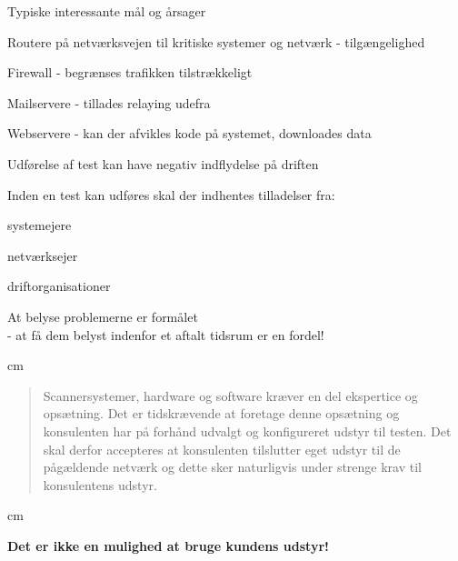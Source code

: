 \documentclass[20pt,landscape,a4paper,footrule]{foils}
\begin{document}


\begin{list1}
\item Typiske interessante mål og årsager
\begin{list2}
\item Routere på netværksvejen til kritiske systemer og netværk -
  tilgængelighed 
\item Firewall - begrænses trafikken tilstrækkeligt
\item Mailservere - tillades relaying udefra
\item Webservere - kan der afvikles kode på systemet, downloades data     
\end{list2}
\end{list1}


\begin{list1}
\item Udførelse af test kan have negativ indflydelse på driften
\item Inden en test kan udføres skal der indhentes tilladelser fra:
\begin{list2}
\item systemejere
\item netværksejer
\item driftorganisationer
\end{list2}
\item At belyse problemerne er formålet\\
- at få dem belyst indenfor et aftalt tidsrum er en fordel!
\end{list1}


 cm
\begin{quote}
Scannersystemer, hardware og software kræver en del ekspertice og
opsætning. Det er tidskrævende at foretage denne opsætning og
konsulenten har på forhånd udvalgt og konfigureret udstyr til testen.  
Det skal derfor accepteres at konsulenten tilslutter eget udstyr til
de pågældende netværk og dette sker naturligvis under strenge krav til
konsulentens udstyr.  
\end{quote}
 cm
\centerline{\bf Det er ikke en mulighed at bruge kundens udstyr!}

\end{document}
